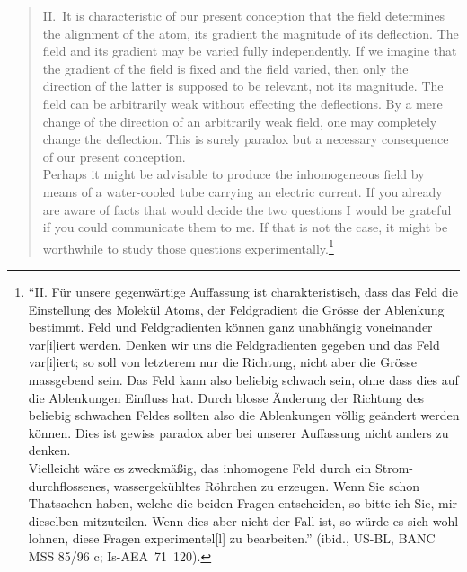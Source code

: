 \documentclass{article}
\begin{document}
\begin{quote}
II.~It is characteristic of our present conception that the field determines the alignment of the atom, its gradient the magnitude of its deflection. The field and its gradient may be varied fully independently. If we imagine that the gradient of the field is fixed and the field varied, then only the direction of the latter is supposed to be relevant, not its magnitude. The field can be arbitrarily weak without effecting the deflections. By a mere change of the direction of an arbitrarily weak field, one may completely change the deflection. This is surely paradox but a necessary consequence of our present conception.\\
Perhaps it might be advisable to produce the inhomogeneous field by means of a water-cooled tube carrying an electric current. If you already are aware of facts that would decide the two questions I would be grateful if you could communicate them to me. If that is not the case, it might be worthwhile to study those questions experimentally.\footnote{%
``II. Für unsere gegenwärtige Auffassung ist charakteristisch, dass das Feld die Einstellung des Molekül Atoms, der Feldgradient die Grösse der Ablenkung bestimmt. Feld und Feldgradienten können ganz unabhängig voneinander var[i]iert werden. Denken wir uns die Feldgradienten gegeben und das Feld var[i]iert; so soll von letzterem nur die Richtung, nicht aber die Grösse massgebend sein. Das Feld kann also beliebig schwach sein, ohne dass dies auf die Ablenkungen Einfluss hat. Durch blosse Änderung der Richtung des beliebig schwachen Feldes sollten also die Ablenkungen völlig geändert werden können. Dies ist gewiss paradox aber bei unserer Auffassung nicht anders zu denken.\\
           Vielleicht wäre es zweckmäßig, das inhomogene Feld durch ein Strom-durchflossenes, wassergekühltes Röhrchen zu erzeugen. Wenn Sie schon Thatsachen haben, welche die beiden Fragen entscheiden, so bitte ich Sie, mir dieselben mitzuteilen. Wenn dies aber nicht der Fall ist, so würde es sich wohl lohnen, diese Fragen experimentel[l] zu bearbeiten.''
(ibid., US-BL, BANC MSS 85/96 c; Is-AEA~71~120).
}
\end{quote}
%
\end{document}
